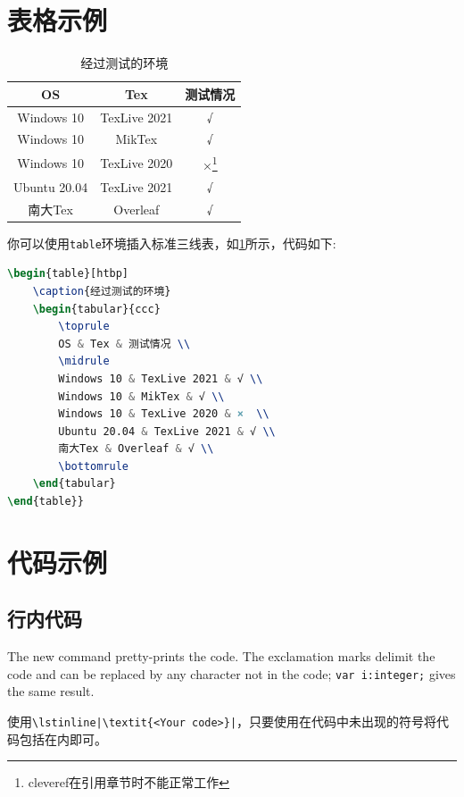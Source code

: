 \section{表格示例}
\begin{table}[htbp]
    \caption{经过测试的环境}
    \label{tab:testtab}
    \begin{tabular}{ccc}
        \toprule
        OS & Tex & 测试情况 \\
        \midrule
        Windows 10 & TexLive 2021 & √ \\
        Windows 10 & MikTex & √ \\
        Windows 10 & TexLive 2020 & ×\footnote{cleveref在引用章节时不能正常工作}  \\
        Ubuntu 20.04 & TexLive 2021 & √ \\
        南大Tex & Overleaf & √ \\
        \bottomrule
    \end{tabular}
\end{table}
你可以使用\lstinline|table|环境插入标准三线表，如\cref{tab:testtab}所示，代码如下:
\begin{lstlisting}[language=TeX]
\begin{table}[htbp]
    \caption{经过测试的环境}
    \begin{tabular}{ccc}
        \toprule
        OS & Tex & 测试情况 \\
        \midrule
        Windows 10 & TexLive 2021 & √ \\
        Windows 10 & MikTex & √ \\
        Windows 10 & TexLive 2020 & ×  \\
        Ubuntu 20.04 & TexLive 2021 & √ \\
        南大Tex & Overleaf & √ \\
        \bottomrule
    \end{tabular}
\end{table}}
\end{lstlisting}



\section{代码示例}


\subsection{行内代码}
The new command pretty-prints the code. The exclamation marks delimit
the code and can be replaced by any character not in the code;
\lstinline$var i:integer;$ gives the same result.

使用\lstinline!\lstinline|\textit{<Your code>}|!，只要使用在代码中未出现的符号将代码包括在内即可。